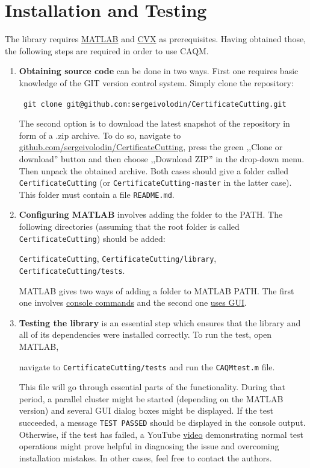 \documentclass[a4paper]{article}
\theoremstyle{definition}
\begin{document}
\section*{Installation and Testing}
The library requires \href{https://www.mathworks.com/downloads/}{MATLAB} and \href{http://cvxr.com/cvx/download/}{CVX} as prerequisites. Having obtained those, the following steps are required in order to use CAQM.
\begin{enumerate}
\item {\bf Obtaining source code} can be done in two ways. First one requires basic knowledge of the GIT version control system. Simply clone the repository:
\begin{center}\tt
git clone git@github.com:sergeivolodin/CertificateCutting.git
\end{center}
The second option is to download the latest snapshot of the repository in form of a .zip archive. To do so, navigate to \href{https://github.com/sergeivolodin/CertificateCutting}{github.com/sergeivolodin/CertificateCutting}, press the green ,,Clone or download'' button and then choose ,,Download ZIP'' in the drop-down menu. Then unpack the obtained archive. Both cases should give a folder called {\tt CertificateCutting} (or {\tt CertificateCutting-master} in the latter case). This folder must contain a file {\tt README.md}.
\item {\bf Configuring MATLAB} involves adding the folder to the PATH. The following directories (assuming that the root folder is called {\tt CertificateCutting}) should be added: 

\begin{center}
{\tt CertificateCutting}, {\tt CertificateCutting/library}, {\tt CertificateCutting/tests}.
\end{center}

MATLAB gives two ways of adding a folder to MATLAB PATH. The first one involves \href{https://www.mathworks.com/help/matlab/ref/addpath.html}{console commands} and the second one \href{http://www.mathworks.com/help/matlab/ref/pathtool.html}{uses GUI}.
\item {\bf Testing the library} is an essential step which ensures that the library and all of its dependencies were installed correctly. To run the test, open MATLAB,

\begin{center}
navigate to {\tt CertificateCutting/tests} and run the {\tt CAQMtest.m} file.
\end{center}

This file will go through essential parts of the functionality. During that period, a parallel cluster might be started (depending on the MATLAB version) and several GUI dialog boxes might be displayed. If the test succeeded, a message {\tt TEST PASSED} should be displayed in the console output. Otherwise, if the test has failed, a YouTube \href{https://youtu.be/Ikh_GDHnu-4}{video} demonstrating normal test operations might prove helpful in diagnosing the issue and overcoming installation mistakes. In other cases, feel free to contact the authors.
\end{enumerate}
\end{document}
